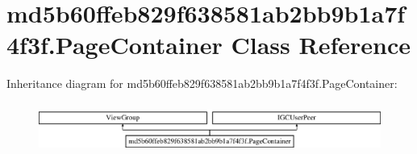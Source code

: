 \hypertarget{classmd5b60ffeb829f638581ab2bb9b1a7f4f3f_1_1PageContainer}{}\section{md5b60ffeb829f638581ab2bb9b1a7f4f3f.\+Page\+Container Class Reference}
\label{classmd5b60ffeb829f638581ab2bb9b1a7f4f3f_1_1PageContainer}
Inheritance diagram for md5b60ffeb829f638581ab2bb9b1a7f4f3f.\+Page\+Container\+:\begin{figure}[H]
\begin{center}
\leavevmode
\includegraphics[height=1.661721cm]{classmd5b60ffeb829f638581ab2bb9b1a7f4f3f_1_1PageContainer}
\end{center}
\end{figure}
